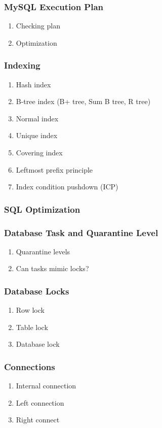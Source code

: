 \documentclass[11pt, twocolumn]{article}
\begin{document}
\subsubsection{MySQL Execution Plan}
\begin{enumerate}
	\item Checking plan
	\item Optimization
\end{enumerate}

\subsubsection{Indexing}
\begin{enumerate}
	\item Hash index
	\item B-tree index (B+ tree, Sum B tree, R tree)
	\item Normal index
	\item Unique index
	\item Covering index
	\item Leftmost prefix principle
	\item Index condition pushdown (ICP)
\end{enumerate}

\subsubsection{SQL Optimization}

\subsubsection{Database Task and Quarantine Level}
\begin{enumerate}
	\item Quarantine levels
	\item Can tasks mimic locks?
\end{enumerate}

\subsubsection{Database Locks}
\begin{enumerate}
	\item Row lock
	\item Table lock
	\item Database lock
\end{enumerate}

\subsubsection{Connections}
\begin{enumerate}
	\item Internal connection
	\item Left connection
	\item Right connect
\end{enumerate}
\end{document}

